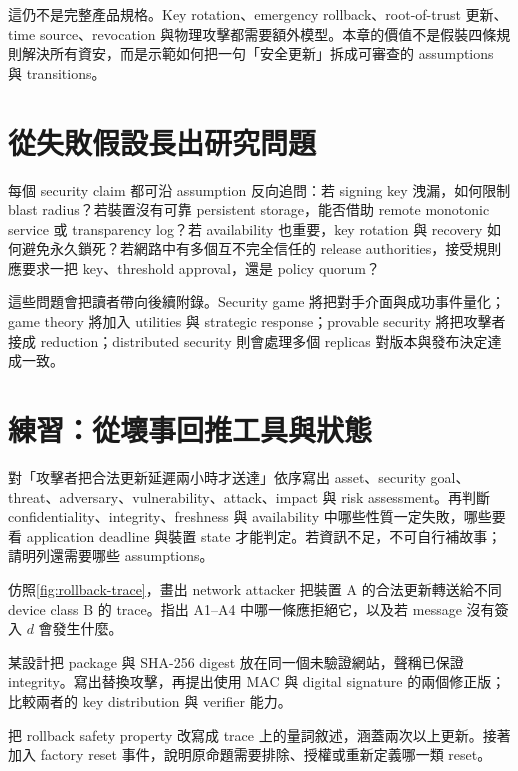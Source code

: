 \documentclass[11pt,a4paper,oneside,openany]{book}
\begin{document}
這仍不是完整產品規格。Key rotation、emergency rollback、root-of-trust 更新、time source、revocation 與物理攻擊都需要額外模型。本章的價值不是假裝四條規則解決所有資安，而是示範如何把一句「安全更新」拆成可審查的 assumptions 與 transitions。

\section{從失敗假設長出研究問題}
每個 security claim 都可沿 assumption 反向追問：若 signing key 洩漏，如何限制 blast radius？若裝置沒有可靠 persistent storage，能否借助 remote monotonic service 或 transparency log？若 availability 也重要，key rotation 與 recovery 如何避免永久鎖死？若網路中有多個互不完全信任的 release authorities，接受規則應要求一把 key、threshold approval，還是 policy quorum？

這些問題會把讀者帶向後續附錄。Security game 將把對手介面與成功事件量化；game theory 將加入 utilities 與 strategic response；provable security 將把攻擊者接成 reduction；distributed security 則會處理多個 replicas 對版本與發布決定達成一致。

\section{練習：從壞事回推工具與狀態}
\begin{exercise}
對「攻擊者把合法更新延遲兩小時才送達」依序寫出 asset、security goal、threat、adversary、vulnerability、attack、impact 與 risk assessment。再判斷 confidentiality、integrity、freshness 與 availability 中哪些性質一定失敗，哪些要看 application deadline 與裝置 state 才能判定。若資訊不足，不可自行補故事；請明列還需要哪些 assumptions。
\end{exercise}

\begin{exercise}
仿照\cref{fig:rollback-trace}，畫出 network attacker 把裝置 A 的合法更新轉送給不同 device class B 的 trace。指出 A1--A4 中哪一條應拒絕它，以及若 message 沒有簽入 $d$ 會發生什麼。
\end{exercise}

\begin{exercise}
某設計把 package 與 SHA-256 digest 放在同一個未驗證網站，聲稱已保證 integrity。寫出替換攻擊，再提出使用 MAC 與 digital signature 的兩個修正版；比較兩者的 key distribution 與 verifier 能力。
\end{exercise}

\begin{exercise}
把 rollback safety property 改寫成 trace 上的量詞敘述，涵蓋兩次以上更新。接著加入 factory reset 事件，說明原命題需要排除、授權或重新定義哪一類 reset。
\end{exercise}
\end{document}
